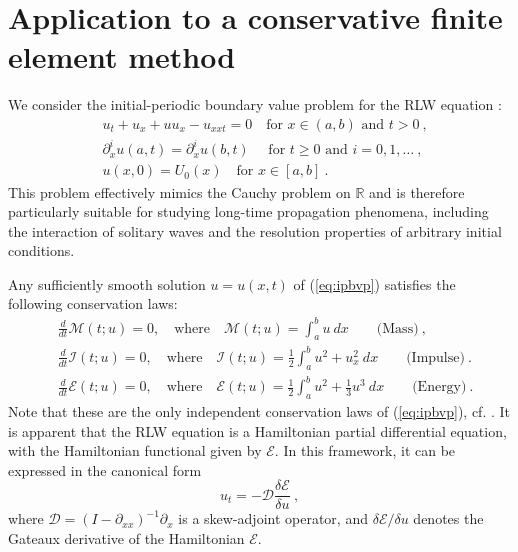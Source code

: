 \documentclass{amsart}
\begin{document}
\section{Application to a conservative finite element method}\label{sec:galerkin}



We consider the initial-periodic boundary value problem for the RLW equation \cite{BD1980}:
\begin{equation}\label{eq:ipbvp}
\begin{aligned}
&u_t+u_x+uu_x-u_{xxt}= 0 \quad\text{for $x\in (a,b)$ and $t>0$}\ ,\\
& \partial^i_x u(a,t)=\partial^i_x u(b,t) \quad \text{ for $t\geq 0$ and $i=0,1,\dots$}\ ,\\
& u(x,0)=U_0(x)\quad \text{for $x\in[a,b]$}\ .
\end{aligned}
\end{equation}
This problem effectively mimics the Cauchy problem on $\mathbb{R}$ and is therefore particularly suitable for studying long-time propagation phenomena, including the interaction of solitary waves and the resolution properties of arbitrary initial conditions.

Any sufficiently smooth solution $u=u(x,t)$ of (\ref{eq:ipbvp}) satisfies the following conservation laws:
%
\begin{align}
&\frac{d}{dt}\mathcal{M}(t;u)=0, \quad\text{where}\quad\mathcal{M}(t;u)=\int_a^b u~dx\qquad \text{(Mass)} \ , \label{eq:massc} \\
&\frac{d}{dt}\mathcal{I}(t;u)=0,\quad \text{where} \quad \mathcal{I}(t;u)=\frac{1}{2}\int_a^b u^2+u_x^2~dx\qquad \text{(Impulse)}\ . \label{eq:momentumc} \\
&\frac{d}{dt}\mathcal{E}(t;u)=0,\quad \text{where} \quad \mathcal{E}(t;u)=\frac{1}{2}\int_a^b u^2+\frac{1}{3}u^3~dx\qquad \text{(Energy)}\ . \label{eq:energyc} 
\end{align}
%
Note that these are the only independent conservation laws of (\ref{eq:ipbvp}), cf. \cite{Olver1979}. 
%
It is apparent that the RLW equation is a Hamiltonian partial differential equation, with the Hamiltonian functional given by $\mathcal{E}$. In this framework, it can be expressed in the canonical form 
\begin{equation}\label{eq:hamilton}
u_t=-\mathcal{D}\frac{\delta\mathcal{E}}{\delta u}\ ,   
\end{equation}
where $\mathcal{D}=(I-\partial_{xx})^{-1}\partial_x$ is a skew-adjoint operator, and $\delta\mathcal{E}/\delta u$ denotes the Gateaux derivative of the Hamiltonian $\mathcal{E}$.
\end{document}
